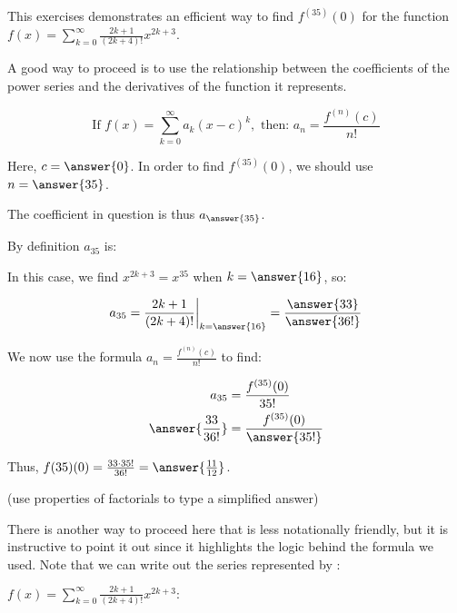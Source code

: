 \documentclass{ximera}
\author{Jim Talamo}
\begin{document}
\begin{exercise}
This exercises demonstrates an efficient way to find $f^{(35)}(0)$ for the function $f(x) = \sum_{k=0}^{\infty} \frac{2k+1}{(2k+4)!}x^{2k+3}$.  

A good way to proceed is to use the relationship between the coefficients of the power series and the derivatives of the function it represents.

\[
\textrm{If } f(x) = \sum_{k=0}^{\infty} a_k(x-c)^k, \textrm{ then: } a_n = \frac{f^{(n)}(c)}{n!}
\]

Here, $c=\answer{0}$.  In order to find $f^{(35)}(0)$, we should use $n=\answer{35}$.

The coefficient in question is thus $a_{\answer{35}}$.  

\begin{exercise}
By definition $a_{35}$ is:

\begin{multipleChoice}
\end{multipleChoice}

In this case, we find $x^{2k+3}=x^{35}$ when $k=\answer{16}$, so:

\[
a_{35} =  \frac{2k+1}{(2k+4)!} \bigg|_{k=\answer{16}} = \frac{\answer{33}}{\answer{36!}}
\]

\begin{exercise}
We now use the formula $a_n = \frac{f^{(n)}(c)}{n!}$ to find:

\begin{align*}
a_{35} &= \frac{f^{(35)}(0)}{35!} \\
\answer{\frac{33}{36!}} &= \frac{f^{(35)}(0)}{\answer{35!}}
\end{align*}

\begin{exercise}
Thus, $f{(35)}(0) = \frac{33 \cdot 35!}{36!} = \answer{\frac{11}{12}}$.

(use properties of factorials to type a simplified answer)

\begin{exercise}
There is another way to proceed here that is less notationally
friendly, but it is instructive to point it out since it highlights
the logic behind the formula we used.  Note that we can write out the
series represented by :

$f(x) = \sum_{k=0}^{\infty} \frac{2k+1}{(2k+4)!}x^{2k+3}:$


\end{exercise}
\end{exercise}
\end{exercise}
\end{exercise}
\end{exercise}
\end{document}
